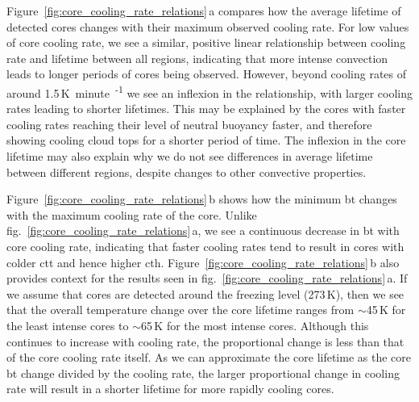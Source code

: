 Figure~\ref{fig:core_cooling_rate_relations}\,a compares how the average lifetime of detected cores changes with their maximum observed cooling rate.
For low values of core cooling rate, we see a similar, positive linear relationship between cooling rate and lifetime between all regions, indicating that more intense convection leads to longer periods of cores being observed.
However, beyond cooling rates of around 1.5\,\unit{K minute\textsuperscript{-1}} we see an inflexion in the relationship, with larger cooling rates leading to shorter lifetimes.
This may be explained by the cores with faster cooling rates reaching their level of neutral buoyancy faster, and therefore showing cooling cloud tops for a shorter period of time.
The inflexion in the core lifetime may also explain why we do not see differences in average lifetime between different regions, despite changes to other convective properties.

Figure~\ref{fig:core_cooling_rate_relations}\,b shows how the minimum \acrshort{bt} changes with the maximum cooling rate of the core.
Unlike fig.~\ref{fig:core_cooling_rate_relations}\,a, we see a continuous decrease in \acrshort{bt} with core cooling rate, indicating that faster cooling rates tend to result in cores with colder \acrshort{ctt} and hence higher \acrshort{cth}.
Figure~\ref{fig:core_cooling_rate_relations}\,b also provides context for the results seen in fig.~\ref{fig:core_cooling_rate_relations}\,a.
If we assume that cores are detected around the freezing level (273\,\unit{K}), then we see that the overall temperature change over the core lifetime ranges from $\sim$45\,\unit{K} for the least intense cores to $\sim$65\,\unit{K} for the most intense cores.
Although this continues to increase with cooling rate, the proportional change is less than that of the core cooling rate itself.
As we can approximate the core lifetime as the core \acrshort{bt} change divided by the cooling rate, the larger proportional change in cooling rate will result in a shorter lifetime for more rapidly cooling cores.


